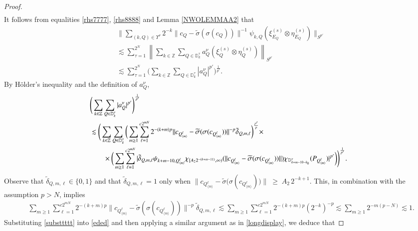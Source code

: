 \documentclass[12pt]{amsart}
\begin{document}
\begin{proof}
\begin{align*}
\end{align*}
It follows from equalities \eqref{rhs7777}, \eqref{rhs8888} and Lemma \ref{NWOLEMMAA2} that
\begin{align}\label{uiop}
&\Bigg\|\sum_{(k,Q)\in\Upsilon^\nu}2^{-k}\|c_Q-\widetilde{\sigma}(\sigma(c_Q))\|^{-1}\psi_{k,Q}(\xi_{E_Q}^{(s)}\otimes \eta_{E_Q}^{(s)})\Bigg\|_{S^{p'}}\nonumber\\
&\lesssim \sum_{\tau=1}^{2^N}\left\|\sum_{k\in\mathbb{Z}}\sum_{Q\in\mathbb{D}_k^\tau}a_Q^\nu(\xi_Q^{(s)}\otimes \eta_Q^{(s)})\right\|_{S^{p'}}\nonumber\\
&\lesssim \sum_{\tau=1}^{2^N}\Bigg(\sum_{k\in\mathbb{Z}}\sum_{Q\in\mathbb{D}_k^\tau}|a_Q^\nu|^{p'}\Bigg)^{\frac{1}{p'}}.
\end{align}
By H\"{o}lder's inequality and the definition of $a_Q^\nu$,
\begin{align}\label{eded}
  &\Bigg(\sum_{k\in\mathbb{Z}}\sum_{Q\in\mathbb{D}_k^\tau}|a_Q^\nu|^{p'}\Bigg)^{\frac{1}{p'}}\nonumber\\
  &\lesssim \Bigg(\sum_{k\in\mathbb{Z}}\sum_{Q\in\mathbb{D}_k^\tau}\bigg(\sum_{m\geq 1}\sum_{\ell=1}^{c2^{mN}}2^{-(k+m)p}\|c_{Q_{\langle m\rangle}^\ell}-\widetilde{\sigma}(\sigma(c_{Q_{\langle m\rangle}^\ell}))\|^{-p}\tilde{\delta}_{Q,m,\ell}\bigg)^{\frac{p'}{p}}\times\nonumber\\
  &\hspace{0.7cm}\times \bigg(\sum_{m\geq 1}\sum_{\ell=1}^{c2^{mN}}|\tilde{\delta}_{Q,m,\ell}\psi_{k+m-10,Q_{\langle m \rangle}^\ell}\chi_{[A_22^{-(k+m-11)},\infty)}(\|c_{Q_{\langle m\rangle}^\ell}-\widetilde{\sigma}(\sigma(c_{Q_{\langle m\rangle}^\ell}))\|)\chi_{\mathbb{D}_{k+m-10-k_0}^\nu}(P_{Q_{\langle m\rangle}^\ell})|^{p'}\bigg)\Bigg)^{\frac{1}{p'}}.
\end{align}
Observe that \(\tilde{\delta}_{Q,m,\ell}\in\{0,1\}\) and that \(\tilde{\delta}_{Q,m,\ell}=1\) only when
$
\bigl\|c_{Q_{\langle m\rangle}^{\ell}}-\widetilde{\sigma}\bigl(\sigma(c_{Q_{\langle m\rangle}^{\ell}})\bigr)\bigr\|
\;\ge\; A_2\,2^{-k+1}$. This, in combination with the assumption $p>N$, implies
\begin{align}\label{substtttt}
  &\sum_{m\geq 1}\sum_{\ell=1}^{c2^{mN}}2^{-(k+m)p}\|c_{Q_{\langle m\rangle}^\ell}-\widetilde{\sigma}(\sigma(c_{Q_{\langle m\rangle}^\ell}))\|^{-p}\tilde{\delta}_{Q,m,\ell}\lesssim \sum_{m\geq 1}\sum_{\ell=1}^{c2^{mN}}2^{-(k+m)p}(2^{-k})^{-p}\lesssim \sum_{m\geq 1}2^{-m(p-N)}\lesssim 1.
\end{align}
Substituting \eqref{substtttt} into \eqref{eded} and then applying a similar argument as in \eqref{longdisplay}, we deduce that

\end{proof}
\end{document}
